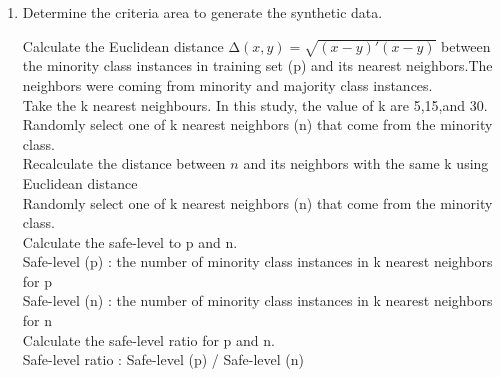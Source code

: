 \begin{enumerate}
\item{ Determine the criteria area to generate the synthetic data}.

\indent{} Calculate the Euclidean distance $∆(x,y) = \sqrt {(x − y)′ (x − y)}$ between the minority class instances in training set (p) and its nearest neighbors.The neighbors were coming from minority and majority class instances.\noindent \\
\indent{} Take the k nearest neighbours. In this study, the value of k are 5,15,and 30. \noindent \\
\indent{} Randomly select one of k nearest neighbors (n) that come from the minority class. \noindent \\
\indent{} Recalculate the distance between $n$ and its neighbors with the same k using Euclidean distance \noindent \\
\indent{} Randomly select one of k nearest neighbors (n) that come from the minority class. \noindent \\
\indent{} Calculate the safe-level to p and n. \noindent \\
\indent\indent        Safe-level (p) : the number of minority class instances in k nearest neighbors for p \noindent \\
\indent\indent        Safe-level (n) : the number of minority class instances in k nearest neighbors for n \noindent \\
\indent{} Calculate the safe-level ratio for p and n. \noindent \\
\indent\indent \indent  Safe-level ratio : Safe-level (p) / Safe-level (n)\noindent \\
    

\end{enumerate}

